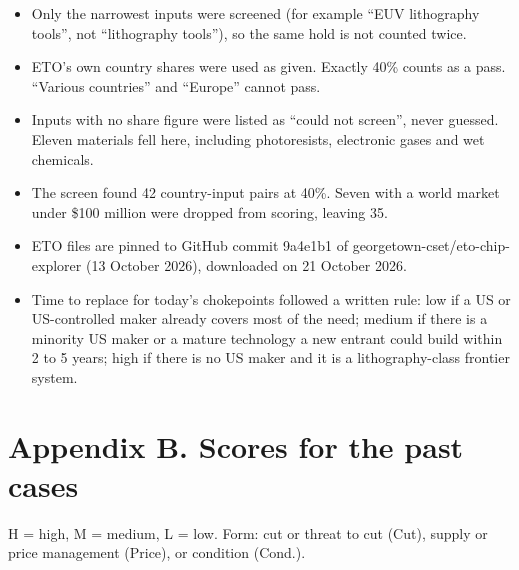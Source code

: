 \documentclass[11pt]{article}
\begin{document}
\begin{itemize}[leftmargin=*]
\item Only the narrowest inputs were screened (for example ``EUV lithography tools'', not ``lithography tools''), so the same hold is not counted twice.
\item ETO's own country shares were used as given. Exactly 40\% counts as a pass. ``Various countries'' and ``Europe'' cannot pass.
\item Inputs with no share figure were listed as ``could not screen'', never guessed. Eleven materials fell here, including photoresists, electronic gases and wet chemicals.
\item The screen found 42 country-input pairs at 40\%. Seven with a world market under \$100 million were dropped from scoring, leaving 35.
\item ETO files are pinned to GitHub commit 9a4e1b1 of georgetown-cset/eto-chip-explorer (13 October 2026), downloaded on 21 October 2026.
\item Time to replace for today's chokepoints followed a written rule: low if a US or US-controlled maker already covers most of the need; medium if there is a minority US maker or a mature technology a new entrant could build within 2 to 5 years; high if there is no US maker and it is a lithography-class frontier system.
\end{itemize}

\section*{Appendix B. Scores for the past cases}

H = high, M = medium, L = low. Form: cut or threat to cut (Cut), supply or price management (Price), or condition (Cond.).
\end{document}
